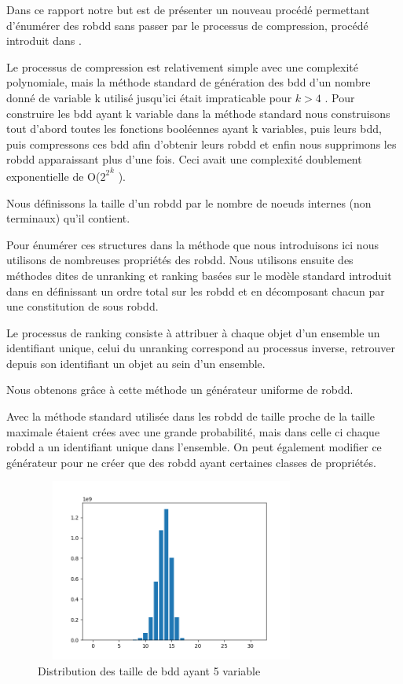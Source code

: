 \documentclass[french]{article}
\begin{document}
Dans ce rapport notre but est de présenter un nouveau procédé permettant d'énumérer des robdd sans passer par le processus de compression, procédé introduit dans \cite{genitrini}.\medskip

Le processus de compression est relativement simple avec une complexité polynomiale, mais la méthode standard de génération des bdd d'un nombre donné de variable k utilisé jusqu'ici était impraticable pour {\(k > 4\)} \cite{newton}. Pour construire les bdd ayant k variable dans la méthode standard nous construisons tout d'abord toutes les fonctions booléennes ayant k variables, puis leurs bdd, puis compressons ces bdd afin d'obtenir leurs robdd et enfin nous supprimons les robdd apparaissant plus d'une fois. Ceci avait une complexité doublement exponentielle de  O(\( {2^2}^k\) ).\medskip

Nous définissons la taille d'un robdd par le nombre de noeuds internes (non terminaux) qu'il contient.

Pour énumérer ces structures dans la méthode que nous introduisons ici nous utilisons de nombreuses propriétés des robdd.  Nous utilisons ensuite des méthodes dites de unranking et ranking basées sur le modèle standard introduit dans \cite{wilf} en définissant un ordre total sur les robdd et en décomposant chacun par une constitution de sous robdd.

Le processus de ranking consiste à attribuer à chaque objet d'un ensemble un identifiant unique, celui du unranking correspond au processus inverse, retrouver depuis son identifiant un objet au sein d'un ensemble.\medskip

Nous obtenons grâce à cette méthode un générateur uniforme de robdd.\medskip

Avec la méthode standard utilisée dans \cite{newton} les robdd de taille proche de la taille maximale étaient crées avec une grande probabilité, mais dans celle ci chaque robdd a un identifiant unique dans l'ensemble. On peut également modifier ce générateur pour ne créer que des robdd ayant certaines classes de propriétés.

\begin{figure}[htp]
    \centering
    \includegraphics[width=9cm, height=6cm]{index5}
    \caption{Distribution des taille de bdd ayant 5 variable}
    \label{fig:Figure1.2}
\end{figure}
\end{document}
